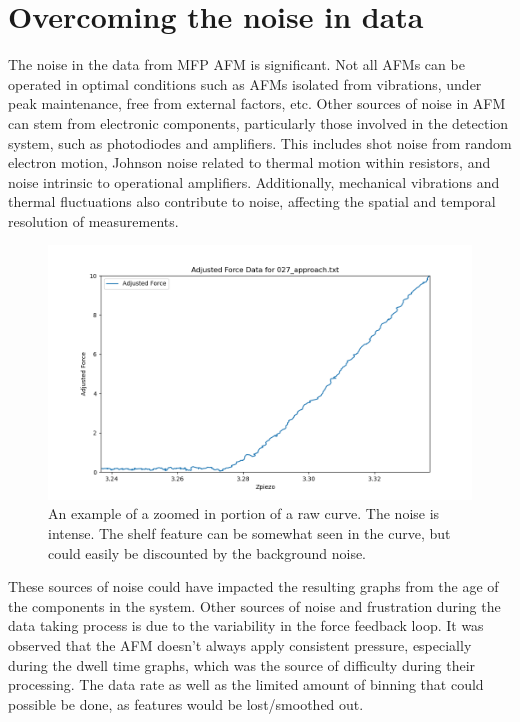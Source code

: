 \section{Overcoming the noise in data}

The noise in the data from MFP AFM is significant. Not all AFMs can be operated in optimal conditions such as AFMs isolated from vibrations, under peak maintenance, free from external factors, etc. Other sources of noise in AFM can stem from electronic components, particularly those involved in the detection system, such as photodiodes and amplifiers. This includes shot noise from random electron motion, Johnson noise related to thermal motion within resistors, and noise intrinsic to operational amplifiers. Additionally, mechanical vibrations and thermal fluctuations also contribute to noise, affecting the spatial and temporal resolution of measurements. \cite{gittes1997signals}

\begin{figure}[h!]
\centering
\includegraphics[width=\textwidth]{chapter8/Shelf/027_approach_zoom.png}
\caption{An example of a zoomed in portion of a raw curve. The noise is intense. The shelf feature can be somewhat seen in the curve, but could easily be discounted by the background noise.}
\label{fig:noisey}
\end{figure}

These sources of noise could have impacted the resulting graphs from the age of the components in the system. Other sources of noise and frustration during the data taking process is due to the variability in the force feedback loop. It was observed that the AFM doesn't always apply consistent pressure, especially during the dwell time graphs, which was the source of difficulty during their processing. The data rate as well as the limited amount of binning that could possible be done, as features would be lost/smoothed out. 

